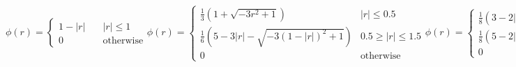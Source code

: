 \begin{subequations}\label{eq:C3_phiFunction}
\begin{equation}\label{eq:C3_phiFunction_2point}
    \phi(r) = 
    \begin{cases}
    1 - |r| \quad &|r| \leq 1 \\
    0    \quad &\text{otherwise}
    \end{cases}
\end{equation}
\begin{equation}\label{eq:C3_phiFunction_3point}
    \phi(r) = 
    \begin{cases}
        \frac{1}{3} \left( 1 + \sqrt{-3r^2 + 1} \right) \quad &|r| \leq 0.5 \\
        \frac{1}{6} \left( 5 - 3|r| - \sqrt{-3(1 - |r|)^2 + 1} \right) & 0.5 \geq |r| \leq 1.5 \\
        0 & \text{otherwise}
    \end{cases}
\end{equation}
\begin{equation}\label{eq:C3_phiFunction_4point}
    \phi(r) = 
    \begin{cases}
        \frac{1}{8}
        \left(
        3 - 2|r| + \sqrt{1 + 4|r| - 4r^2}
        \right) \quad &0 \leq |r| \leq 1
        \\
        \frac{1}{8}
        \left(
        5 - 2|r| + \sqrt{-7 + 12|r| - 4r^2}
        \right) \quad &1 \leq |r| \leq 2
        \\
        0 &\text{otherwise}
    \end{cases}
\end{equation}
\begin{equation}\label{eq:C3_phiFunction_6point}
    \phi(r) = 
    \begin{cases}
        \begin{split}
        \frac{61}{112} - \frac{11}{42} |r| - \frac{11}{56} |r|^2 + \frac{1}{12} |r|^3 + 
        \frac{\sqrt{3}}{336}
        \left( 243 + 1584 |r| \right. \\
        \left. - 748 |r|^2 - 1560 |r|^3 + 500 |r|^4 + 336 |r|^5 - 112 |r|^6
        \right)^{1/2}
        \end{split} \quad & 0 \leq |r| \leq 1
        \\
        \frac{21}{16} + \frac{7}{12} |r| - \frac{7}{8} |r|^2 + \frac{1}{6} |r|^3 - 
        \frac{3}{2} \phi \left( |r| - 1 \right) & 1 \leq |r| \leq 2
        \\
        \frac{9}{8} - \frac{23}{12} |r| + \frac{3}{4} |r|^2 - \frac{1}{12} |r|^3 + 
        \frac{1}{2} \phi \left( |r| - 2 \right) & 2 \leq |r| \leq 3
        \\
        0 & \text{otherwise}
    \end{cases}
\end{equation}
\end{subequations}

